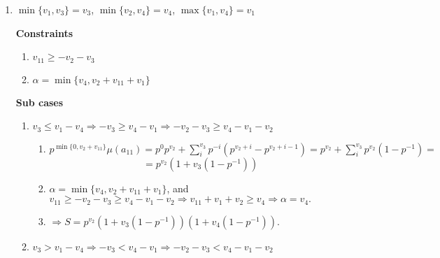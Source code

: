\documentclass{article}
\begin{document}
\begin{enumerate}
\begin{enumerate}
    \end{enumerate}

    \item $\min\{v_1,v_3\}=v_3$, $\min\{v_2,v_4\}=v_4$, $\max\{v_1,v_4\}=v_1$
    
    \textbf{Constraints}
    \begin{enumerate}
        \item $v_{11}\geq{-v_2-v_3}$
        \item $\alpha=\min\{v_4,v_2+v_{11}+v_1\}$
    \end{enumerate}
    
    \textbf{Sub cases}
    \begin{enumerate}
        \item $v_3\leq{v_1-v_4}\Rightarrow{-v_3\geq{v_4-v_1}}\Rightarrow{-v_2-v_3\geq{v_4-v_1-v_2}}$

        \begin{enumerate}
            \item $p^{\min\{0,v_2+v_{11}\}}\mu(a_{11})=p^{0}p^{v_2}+\sum_i^{v_3}p^{-i}(p^{v_2+i}-p^{v_2+i-1})=p^{v_2}+\sum_i^{v_3}p^{v_2}(1-p^{-1})=$\[=p^{v_2}(1+v_3(1-p^{-1}))\]
            \item $\alpha=\min\{v_4,v_2+v_{11}+v_1\}$, and $v_{11}\geq{-v_2-v_3}\geq{v_4-v_1-v_2}\Rightarrow{v_{11}+v_1+v_2\geq{v_4}}\Rightarrow{\alpha=v_4}.$
            \item $\Rightarrow{S=p^{v_2}(1+v_3(1-p^{-1}))(1+v_4(1-p^{-1}))}.$
        \end{enumerate}

        \item $v_3>{v_1-v_4}\Rightarrow{-v_3<{v_4-v_1}}\Rightarrow{-v_2-v_3<{v_4-v_1-v_2}}$


\end{enumerate}
\end{enumerate}
\end{document}
